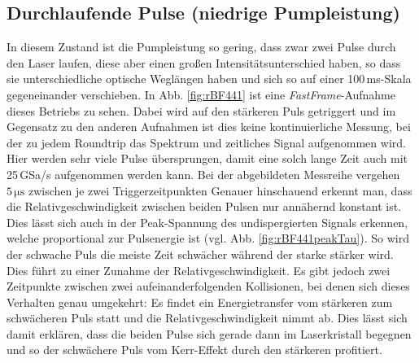 \documentclass[bachelor,       %
               twoside,        %
               BCOR10mm,       %
               english,ngerman, %
               ]{GAUBM}
\begin{document}
\subsection{Durchlaufende Pulse (niedrige Pumpleistung)}
In diesem Zustand ist die Pumpleistung so gering, dass zwar zwei Pulse durch den Laser laufen, diese aber einen großen Intensitätsunterschied haben, so dass sie unterschiedliche optische Weglängen haben und sich so auf einer 100\,ms-Skala gegeneinander verschieben.
In Abb. \ref{fig:rBF441} ist eine \textit{FastFrame}-Aufnahme dieses Betriebs zu sehen.
Dabei wird auf den stärkeren Puls getriggert und im Gegensatz zu den anderen Aufnahmen ist dies keine kontinuierliche Messung, bei der zu jedem Roundtrip das Spektrum und zeitliches Signal aufgenommen wird.
Hier werden sehr viele Pulse übersprungen, damit eine solch lange Zeit auch mit 25\,GSa/s  aufgenommen werden kann.
Bei der abgebildeten Messreihe vergehen $5\,\si{\micro\second}$ zwischen je zwei Triggerzeitpunkten
Genauer hinschauend erkennt man, dass die Relativgeschwindigkeit zwischen beiden Pulsen nur annähernd konstant ist.
Dies lässt sich auch in der Peak-Spannung des undispergierten Signals erkennen, welche proportional zur Pulsenergie ist (vgl. Abb. \ref{fig:rBF441peakTau}).
So wird der schwache Puls die meiste Zeit schwächer während der starke stärker wird.
Dies führt zu einer Zunahme der Relativgeschwindigkeit.
Es gibt jedoch zwei Zeitpunkte zwischen zwei aufeinanderfolgenden Kollisionen, bei denen sich dieses Verhalten genau umgekehrt: Es findet ein Energietransfer vom stärkeren zum schwächeren Puls statt und die Relativgeschwindigkeit nimmt ab.
Dies lässt sich damit erklären, dass die beiden Pulse sich gerade dann im Laserkristall begegnen und so der schwächere Puls vom Kerr-Effekt durch den stärkeren profitiert.
\end{document}
